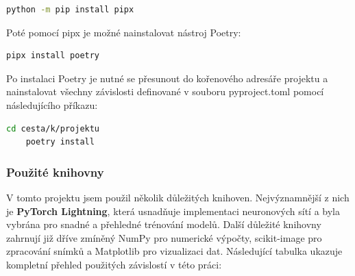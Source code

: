 \documentclass[male,czech,api_ing]{thesis}
\begin{document}
\begin{lstlisting}[language=bash, caption={Instalace pipx}]
    python -m pip install pipx
\end{lstlisting}

Poté pomocí pipx je možné nainstalovat nástroj Poetry:

\begin{lstlisting}[language=bash, caption={Instalace Poetry}]
    pipx install poetry
\end{lstlisting}

Po instalaci Poetry je nutné se přesunout do kořenového adresáře projektu a nainstalovat všechny závislosti definované v souboru pyproject.toml pomocí následujícího příkazu:

\begin{lstlisting}[language=bash, caption={Instalace virtuálního prostředí a knihoven}]
    cd cesta/k/projektu
    poetry install
\end{lstlisting}

\subsubsection{Použité knihovny}
V tomto projektu jsem použil několik důležitých knihoven. Nejvýznamnější z nich je \textbf{PyTorch Lightning}, která usnadňuje implementaci neuronových sítí a byla vybrána pro snadné a přehledné trénování modelů. Další důležité knihovny zahrnují již dříve zmíněný NumPy pro numerické výpočty, scikit-image pro zpracování snímků a Matplotlib pro vizualizaci dat. Následující tabulka ukazuje kompletní přehled použitých závislostí v této práci:
\end{document}
